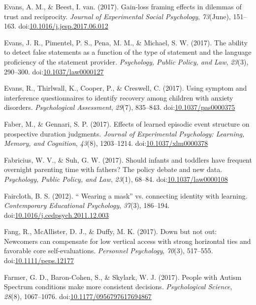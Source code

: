 \documentclass[english,man]{apa6}
\begin{document}
\hypertarget{ref-Evans2017a}{}
Evans, A. M., \& Beest, I. van. (2017). Gain-loss framing effects in
dilemmas of trust and reciprocity. \emph{Journal of Experimental Social
Psychology}, \emph{73}(June), 151--163.
doi:\href{https://doi.org/10.1016/j.jesp.2017.06.012}{10.1016/j.jesp.2017.06.012}

\hypertarget{ref-Evans2017c}{}
Evans, J. R., Pimentel, P. S., Pena, M. M., \& Michael, S. W. (2017).
The ability to detect false statements as a function of the type of
statement and the language proficiency of the statement provider.
\emph{Psychology, Public Policy, and Law}, \emph{23}(3), 290--300.
doi:\href{https://doi.org/10.1037/law0000127}{10.1037/law0000127}

\hypertarget{ref-Evans2017}{}
Evans, R., Thirlwall, K., Cooper, P., \& Creswell, C. (2017). Using
symptom and interference questionnaires to identify recovery among
children with anxiety disorders. \emph{Psychological Assessment},
\emph{29}(7), 835--843.
doi:\href{https://doi.org/10.1037/pas0000375}{10.1037/pas0000375}

\hypertarget{ref-Faber2017}{}
Faber, M., \& Gennari, S. P. (2017). Effects of learned episodic event
structure on prospective duration judgments. \emph{Journal of
Experimental Psychology: Learning, Memory, and Cognition}, \emph{43}(8),
1203--1214.
doi:\href{https://doi.org/10.1037/xlm0000378}{10.1037/xlm0000378}

\hypertarget{ref-Fabricius2017}{}
Fabricius, W. V., \& Suh, G. W. (2017). Should infants and toddlers have
frequent overnight parenting time with fathers? The policy debate and
new data. \emph{Psychology, Public Policy, and Law}, \emph{23}(1),
68--84.
doi:\href{https://doi.org/10.1037/law0000108}{10.1037/law0000108}

\hypertarget{ref-Faircloth2012}{}
Faircloth, B. S. (2012). `` Wearing a mask'' vs. connecting identity
with learning. \emph{Contemporary Educational Psychology}, \emph{37}(3),
186--194.
doi:\href{https://doi.org/10.1016/j.cedpsych.2011.12.003}{10.1016/j.cedpsych.2011.12.003}

\hypertarget{ref-Fang2017}{}
Fang, R., McAllister, D. J., \& Duffy, M. K. (2017). Down but not out:
Newcomers can compensate for low vertical access with strong horizontal
ties and favorable core self-evaluations. \emph{Personnel Psychology},
\emph{70}(3), 517--555.
doi:\href{https://doi.org/10.1111/peps.12177}{10.1111/peps.12177}

\hypertarget{ref-Farmer2017}{}
Farmer, G. D., Baron-Cohen, S., \& Skylark, W. J. (2017). People with
Autism Spectrum conditions make more consistent decisions.
\emph{Psychological Science}, \emph{28}(8), 1067--1076.
doi:\href{https://doi.org/10.1177/0956797617694867}{10.1177/0956797617694867}
\end{document}
